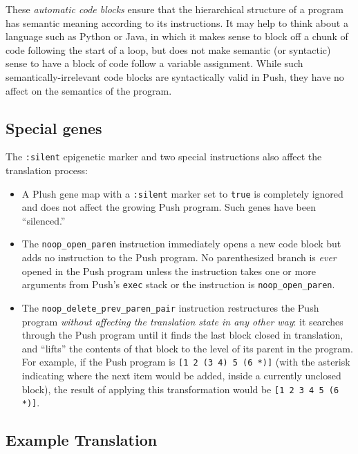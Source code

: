 \documentclass[graybox]{svmult}
\begin{document}
These \textit{automatic code blocks} ensure that the hierarchical structure of a program has semantic meaning according to its instructions. It may help to think about a language such as Python or Java, in which it makes sense to block off a chunk of code following the start of a loop, but does not make semantic (or syntactic) sense to have a block of code follow a variable assignment. While such semantically-irrelevant code blocks are syntactically valid in Push, they have no affect on the semantics of the program.


\subsection{Special genes}
\label{special-instructions}

The \texttt{:silent} epigenetic marker and two special instructions also affect the translation process:

\begin{itemize}
\item
A Plush gene map with a \texttt{:silent} marker set to \texttt{true} is completely ignored and does not affect the growing Push program. Such genes have been ``silenced.''

\item
The  \texttt{noop\_open\_paren} instruction immediately opens a new code block but adds no instruction to the Push program. No parenthesized branch is \textit{ever} opened in the Push program unless the instruction takes one or more arguments from Push's \texttt{exec} stack or the instruction is \texttt{noop\_open\_paren}.

\item
The  \texttt{noop\_delete\_prev\_paren\_pair}  instruction restructures the Push program \textit{without affecting the translation state in any other way}: it searches through the Push program until it finds the last block closed in translation, and ``lifts'' the contents of that block to the level of its parent in the program. For example, if the Push program is \texttt{[1 2 (3 4) 5 (6 *)]} (with the asterisk indicating where the next item would be added, inside a currently unclosed block), the result of applying this transformation would be \texttt{[1 2 3 4 5 (6 *)]}.

\end{itemize}


\subsection{Example Translation}
\end{document}
